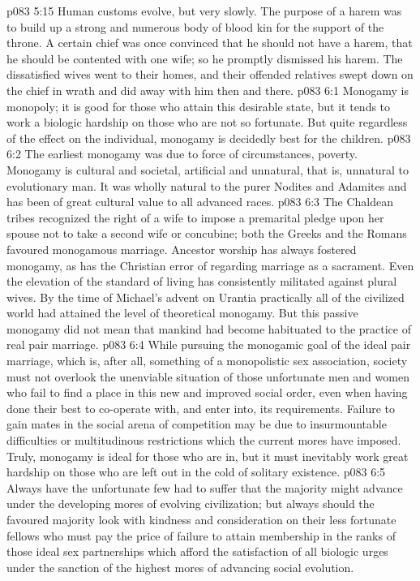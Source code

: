 \vs p083 5:15 Human customs evolve, but very slowly. The purpose of a harem was to build up a strong and numerous body of blood kin for the support of the throne. A certain chief was once convinced that he should not have a harem, that he should be contented with one wife; so he promptly dismissed his harem. The dissatisfied wives went to their homes, and their offended relatives swept down on the chief in wrath and did away with him then and there.
\vs p083 6:1 Monogamy is monopoly; it is good for those who attain this desirable state, but it tends to work a biologic hardship on those who are not so fortunate. But quite regardless of the effect on the individual, monogamy is decidedly best for the children.
\vs p083 6:2 The earliest monogamy was due to force of circumstances, poverty. Monogamy is cultural and societal, artificial and unnatural, that is, unnatural to evolutionary man. It was wholly natural to the purer Nodites and Adamites and has been of great cultural value to all advanced races.
\vs p083 6:3 The Chaldean tribes recognized the right of a wife to impose a premarital pledge upon her spouse not to take a second wife or concubine; both the Greeks and the Romans favoured monogamous marriage. Ancestor worship has always fostered monogamy, as has the Christian error of regarding marriage as a sacrament. Even the elevation of the standard of living has consistently militated against plural wives. By the time of Michael’s advent on Urantia practically all of the civilized world had attained the level of theoretical monogamy. But this passive monogamy did not mean that mankind had become habituated to the practice of real pair marriage.
\vs p083 6:4 \pc While pursuing the monogamic goal of the ideal pair marriage, which is, after all, something of a monopolistic sex association, society must not overlook the unenviable situation of those unfortunate men and women who fail to find a place in this new and improved social order, even when having done their best to co\hyp{}operate with, and enter into, its requirements. Failure to gain mates in the social arena of competition may be due to insurmountable difficulties or multitudinous restrictions which the current mores have imposed. Truly, monogamy is ideal for those who are in, but it must inevitably work great hardship on those who are left out in the cold of solitary existence.
\vs p083 6:5 Always have the unfortunate few had to suffer that the majority might advance under the developing mores of evolving civilization; but always should the favoured majority look with kindness and consideration on their less fortunate fellows who must pay the price of failure to attain membership in the ranks of those ideal sex partnerships which afford the satisfaction of all biologic urges under the sanction of the highest mores of advancing social evolution.
